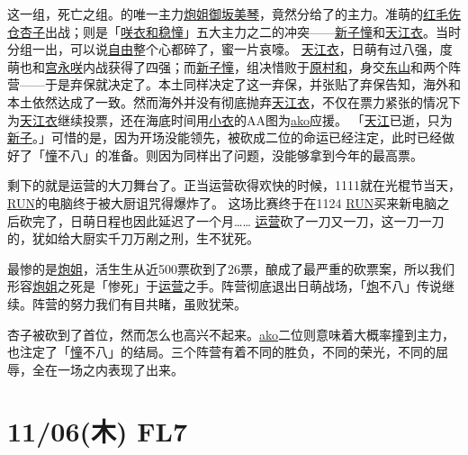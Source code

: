 这一组，死亡之组。的唯一主力\uline{炮姐}\uline{御坂美琴}，竟然分给了的主力。准萌的\uline{红毛}\uline{佐仓杏子}出战；则是「\uline{咲衣和稳憧}」五大主力之二的冲突——\uline{新子憧}和\uline{天江衣}。当时分组一出，可以说\uline{自由}整个心都碎了，蜜一片哀嚎。
\uline{天江衣}，日萌有过八强，度萌也和\uline{宫永咲}内战获得了四强；而\uline{新子憧}，组决惜败于\uline{原村和}，身交\uline{东山}和两个阵营——于是弃保就决定了。本土同样决定了这一弃保，并张贴了弃保告知，海外和本土依然达成了一致。然而海外并没有彻底抛弃\uline{天江衣}，不仅在票力紧张的情况下为\uline{天江衣}继续投票，还在海底时间用\uline{小衣}的AA图为\uline{ako}应援。
「\uline{天江}已逝，只为\uline{新子}。」可惜的是，因为开场没能领先，被砍成二位的命运已经注定，此时已经做好了「\uline{憧}不八」的准备。则因为同样出了问题，没能够拿到今年的最高票。

剩下的就是运营的大刀舞台了。正当运营砍得欢快的时候，1111就在光棍节当天，\uline{RUN}的电脑终于被大厨诅咒得爆炸了。
这场比赛终于在1124 \uline{RUN}买来新电脑之后砍完了，日萌日程也因此延迟了一个月……
\uline{运营}砍了一刀又一刀，这一刀一刀的，犹如给大厨实千刀万剐之刑，生不犹死。

最惨的是\uline{炮姐}，活生生从近500票砍到了26票，酿成了最严重的砍票案，所以我们形容\uline{炮姐}之死是「惨死」于\uline{运营}之手。阵营彻底退出日萌战场，「\uline{炮}不八」传说继续。阵营的努力我们有目共睹，虽败犹荣。

杏子被砍到了首位，然而怎么也高兴不起来。\uline{ako}二位则意味着大概率撞到主力，也注定了「\uline{憧}不八」的结局。三个阵营有着不同的胜负，不同的荣光，不同的屈辱，全在一场之内表现了出来。

\section{11/06(木) FL7}


